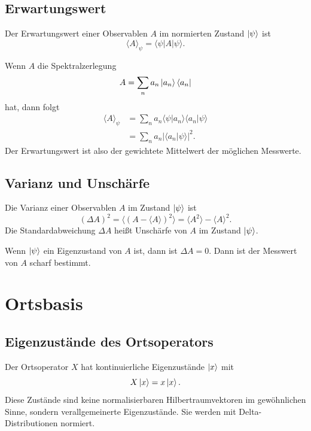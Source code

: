 \subsection{Erwartungswert}

\begin{definitionbox}
Der Erwartungswert einer Observablen $A$ im normierten Zustand $\left|\psi\right\rangle$ ist
\[
    \langle A\rangle_\psi=\langle\psi|A|\psi\rangle.
\]
\end{definitionbox}

Wenn $A$ die Spektralzerlegung
\[
    A=\sum_n a_n\left|a_n\right\rangle\left\langle a_n\right|
\]
hat, dann folgt
\[
\begin{aligned}
    \langle A\rangle_\psi
    &=\sum_n a_n\langle\psi|a_n\rangle\langle a_n|\psi\rangle \\
    &=\sum_n a_n |\langle a_n|\psi\rangle|^2.
\end{aligned}
\]
Der Erwartungswert ist also der gewichtete Mittelwert der möglichen Messwerte.

\subsection{Varianz und Unschärfe}

\begin{definitionbox}
Die Varianz einer Observablen $A$ im Zustand $\left|\psi\right\rangle$ ist
\[
    (\Delta A)^2
    =\langle (A-\langle A\rangle)^2\rangle
    =\langle A^2\rangle-\langle A\rangle^2.
\]
Die Standardabweichung $\Delta A$ heißt Unschärfe von $A$ im Zustand $\left|\psi\right\rangle$.
\end{definitionbox}

Wenn $\left|\psi\right\rangle$ ein Eigenzustand von $A$ ist, dann ist $\Delta A=0$. Dann ist der Messwert von $A$ scharf bestimmt.

\section{Ortsbasis}

\subsection{Eigenzustände des Ortsoperators}

Der Ortsoperator $X$ hat kontinuierliche Eigenzustände $\left|x\right\rangle$ mit
\[
    X\left|x\right\rangle=x\left|x\right\rangle.
\]
Diese Zustände sind keine normalisierbaren Hilbertraumvektoren im gewöhnlichen Sinne, sondern verallgemeinerte Eigenzustände. Sie werden mit Delta-Distributionen normiert.

